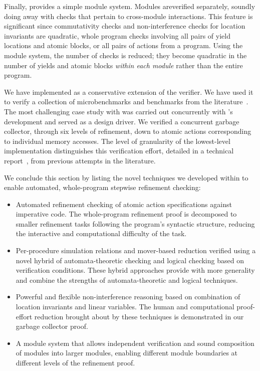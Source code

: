 Finally, \civl provides a simple module system. Modules areverified separately, soundly doing away with checks that pertain to cross-module interactions. 
This feature is significant since commutativity checks and non-interference checks for location invariants are quadratic, whole program checks involving all pairs of yield locations and atomic blocks, or all pairs of actions from a program. 
Using the module system, the number of checks is reduced; they become quadratic in the number of yields and atomic blocks {\em within each module} rather than the entire program. 

We have implemented \civl as a conservative extension of the \boogie verifier.  
We have used it to verify a collection of microbenchmarks and benchmarks from the 
literature~\cite{Blumofe1999,ElmasQT09,ElmasTQ05,FarzanKP14,FlanaganQ03,Herlihy2008}. 
The most challenging case study with \civl was carried out concurrently with \civl's development and served as a design driver. 
We verified a concurrent garbage collector, through six levels of refinement, 
down to atomic actions corresponding to individual memory accesses. 
The level of granularity of the lowest-level implementation distinguishes this verification effort, 
detailed in a technical report~\cite{gc-techreport}, from previous attempts in the literature. 

We conclude this section by listing the novel techniques we developed within \civl to enable automated, whole-program stepwise refinement checking:
\begin{itemize}
\item Automated refinement checking of atomic action specifications against imperative code. 
The whole-program refinement proof is decomposed to smaller refinement tasks following the program's syntactic structure, reducing the interactive and computational difficulty of the task. 
\item Per-procedure simulation relations and mover-based reduction verified using a novel hybrid of automata-theoretic checking and logical checking based on verification conditions. These hybrid approaches provide \civl with more generality and combine the strengths of automata-theoretic and logical techniques. 
\item Powerful and flexible non-interference reasoning based on combination of location invariants and linear variables.
The human and computational proof-effort reduction brought about by these techniques is demonstrated in our garbage collector proof. 
\item A module system that allows independent verification and sound composition of modules into larger modules, enabling different module boundaries at different levels of the refinement proof. 

\end{itemize}
